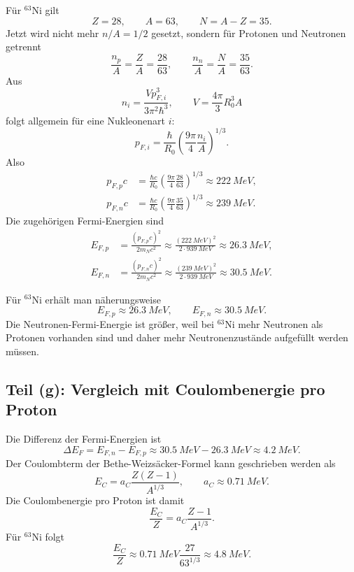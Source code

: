 \documentclass[11pt,a4paper]{scrartcl}
\newcommand{\paren}[1]{\left( #1 \right)}
\newcommand{\isotope}[2]{^{#1}\mathrm{#2}}
\theoremstyle{definition}
\theoremstyle{plain}
\theoremstyle{remark}
\begin{document}
\begin{calculationbox}
Für \(\isotope{63}{Ni}\) gilt
\[
    Z=28,\qquad A=63,\qquad N=A-Z=35.
\]
Jetzt wird nicht mehr \(n/A=1/2\) gesetzt, sondern für Protonen und Neutronen getrennt
\[
    \frac{n_p}{A}=\frac{Z}{A}=\frac{28}{63},
    \qquad
    \frac{n_n}{A}=\frac{N}{A}=\frac{35}{63}.
\]
Aus
\[
    n_i=\frac{Vp_{F,i}^3}{3\pi^2\hbar^3},
    \qquad
    V=\frac{4\pi}{3}R_0^3A
\]
folgt allgemein für eine Nukleonenart \(i\):
\[
    p_{F,i}
    =\frac{\hbar}{R_0}\paren{\frac{9\pi}{4}\frac{n_i}{A}}^{1/3}.
\]
Also
\begin{align*}
    p_{F,p}c
    &= \frac{\hbar c}{R_0}\paren{\frac{9\pi}{4}\frac{28}{63}}^{1/3}
    \approx \SI{222}{MeV},\\
    p_{F,n}c
    &= \frac{\hbar c}{R_0}\paren{\frac{9\pi}{4}\frac{35}{63}}^{1/3}
    \approx \SI{239}{MeV}.
\end{align*}
Die zugehörigen Fermi-Energien sind
\begin{align*}
    E_{F,p}
    &=\frac{(p_{F,p}c)^2}{2m_Nc^2}
    \approx \frac{(\SI{222}{MeV})^2}{2\cdot\SI{939}{MeV}}
    \approx \SI{26.3}{MeV},\\
    E_{F,n}
    &=\frac{(p_{F,n}c)^2}{2m_Nc^2}
    \approx \frac{(\SI{239}{MeV})^2}{2\cdot\SI{939}{MeV}}
    \approx \SI{30.5}{MeV}.
\end{align*}
\end{calculationbox}

\begin{answerbox}
Für \(\isotope{63}{Ni}\) erhält man näherungsweise
\[
    \boxed{E_{F,p}\approx\SI{26.3}{MeV}},
    \qquad
    \boxed{E_{F,n}\approx\SI{30.5}{MeV}}.
\]
Die Neutronen-Fermi-Energie ist größer, weil bei \(\isotope{63}{Ni}\) mehr Neutronen als Protonen vorhanden sind und daher mehr Neutronenzustände aufgefüllt werden müssen.
\end{answerbox}

\subsection{Teil (g): Vergleich mit Coulombenergie pro Proton}

\begin{calculationbox}
Die Differenz der Fermi-Energien ist
\[
    \Delta E_F
    = E_{F,n}-E_{F,p}
    \approx \SI{30.5}{MeV}-\SI{26.3}{MeV}
    \approx \SI{4.2}{MeV}.
\]
Der Coulombterm der Bethe-Weizsäcker-Formel kann geschrieben werden als
\[
    E_C=a_C\frac{Z(Z-1)}{A^{1/3}},
    \qquad
    a_C\approx\SI{0.71}{MeV}.
\]
Die Coulombenergie pro Proton ist damit
\[
    \frac{E_C}{Z}
    = a_C\frac{Z-1}{A^{1/3}}.
\]
Für \(\isotope{63}{Ni}\) folgt
\[
    \frac{E_C}{Z}
    \approx \SI{0.71}{MeV}\frac{27}{63^{1/3}}
    \approx \SI{4.8}{MeV}.
\]
\end{calculationbox}
\end{document}
